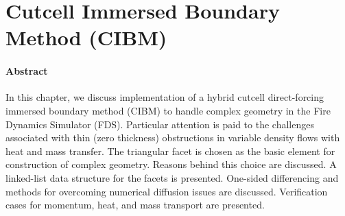 \documentclass[12pt]{article}
\begin{document}


\clearpage

\section{Cutcell Immersed Boundary Method (CIBM)}

\paragraph{Abstract} In this chapter, we discuss implementation of a hybrid cutcell direct-forcing immersed boundary method (CIBM) to handle complex geometry in the Fire Dynamics Simulator (FDS).  Particular attention is paid to the challenges associated with thin (zero thickness) obstructions in variable density flows with heat and mass transfer.  The triangular facet is chosen as the basic element for construction of complex geometry.  Reasons behind this choice are discussed.  A linked-list data structure for the facets is presented.  One-sided differencing and methods for overcoming numerical diffusion issues are discussed.  Verification cases for momentum, heat, and mass transport are presented.
\end{document}
